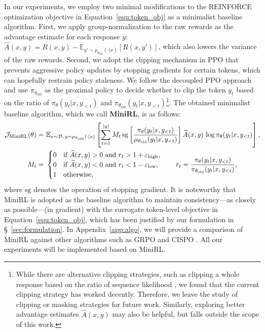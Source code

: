 \documentclass{article}
\begin{document}
In our experiments, we employ two minimal modifications to the REINFORCE optimization objective in Equation~\eqref{equ:token_obj} as a minimalist baseline algorithm.
First, we apply group-normalization \citep{grpo} to the raw rewards as the advantage estimate for each response \(y\): \( \widehat{A}(x, y) = R(x, y) - \mathbb{E}_{ y' \sim \mu_{ \theta_\text{old} } ( \cdot | x ) } \left[ R(x, y') \right] \), which also lowers the variance of the raw rewards.
Second, we adopt the clipping mechanism in PPO \citep{ppo} that prevents aggressive policy updates by stopping gradients for certain tokens, which can hopefully restrain policy staleness.
We follow the decoupled PPO approach \citep{hilton2022batch} and use \( \pi_{ \theta_\text{old} } \) as the proximal policy to decide whether to clip the token \( y_t \) based on the ratio of \( \pi_\theta ( y_t | x, y_{<t} ) \) and \( \pi_{ \theta_\text{old} } ( y_t | x, y_{<t} ) \)\footnote{
While there are alternative clipping strategies, such as clipping a whole response based on the ratio of sequence likelihood \citep{gspo}, we found that the current clipping strategy has worked decently.
Therefore, we leave the study of clipping or masking strategies for future work.
Similarly, exploring better advantage estimates \( \widehat{A}(x, y) \) may also be helpful, but falls outside the scope of this work.
}.
The obtained minimalist baseline algorithm, which we call \textbf{MiniRL}, is as follows:
\begin{align}
\label{equ:minirl}
\mathcal{J}_\text{MiniRL}(\theta)
=&\
\mathbb{E}_{ x \sim \mathcal{D}, \, y \sim \mu_{ \theta_\text{old} } ( \cdot | x ) }
\left[ \sum_{t=1}^{|y|} 
M_t \,
\mathrm{sg} \left[ \frac{ \pi_\theta ( y_t | x, y_{<t} ) }{ \mu_{ \theta_\text{old} } ( y_t | x, y_{<t} ) } \right] 
\widehat{A}(x, y) \, 
\log \pi_\theta ( y_t | x, y_{<t} ) \right], \\
\notag
M_t = &\
\begin{cases}
0 & \text{if } \widehat{A}(x, y) > 0 \text{ and } r_t > 1 + \varepsilon_\text{high},  \\
0 & \text{if } \widehat{A}(x, y) < 0 \text{ and } r_t < 1 - \varepsilon_\text{low}, \\
1  & \text{otherwise},
\end{cases} \quad \quad
r_t = \frac{ \pi_\theta ( y_t | x, y_{<t} ) }{ \pi_{ \theta_\text{old} } ( y_t | x, y_{<t} ) },
\end{align}
where $\mathrm{sg}$ denotes the operation of stopping gradient.
It is noteworthy that MiniRL is adopted as the baseline algorithm to maintain consistency—as closely as possible—(in gradient) with the surrogate token-level objective in Equation~\ref{equ:token_obj}, which has been justified by our formulation in \S~\ref{sec:formulation}.
In Appendix~\ref{app:algo}, we will provide a comparison of MiniRL against other algorithms such as GRPO \citep{grpo} and CISPO \citep{minimax-m1}.
All our experiments will be implemented based on MiniRL.
\end{document}
